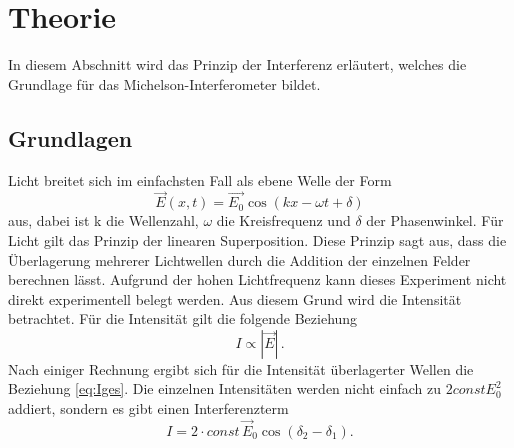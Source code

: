 \section{Theorie}
\label{sec:theorie}

In diesem Abschnitt wird das Prinzip der Interferenz erläutert, welches die Grundlage für das Michelson-Interferometer bildet.

\subsection{Grundlagen}

Licht breitet sich im einfachsten Fall als ebene Welle der Form 
\begin{equation}
    \vec{E}(x,t) = \vec{E_0} \cos{(kx - \omega t + \delta)}
    \label{eq:ebenewellen}
\end{equation}
aus, dabei ist k die Wellenzahl, $\omega$ die Kreisfrequenz und $\delta$ der Phasenwinkel. Für Licht gilt das Prinzip der linearen Superposition. Diese Prinzip sagt aus, dass die Überlagerung mehrerer Lichtwellen durch die Addition der einzelnen Felder berechnen lässt.
Aufgrund der hohen Lichtfrequenz kann dieses Experiment nicht direkt experimentell belegt werden. Aus diesem Grund wird die Intensität betrachtet. Für die Intensität gilt die folgende Beziehung 
\begin{equation*}
    I \propto |\vec{E}| \, .
\end{equation*}
Nach einiger Rechnung ergibt sich für die Intensität überlagerter Wellen die Beziehung \eqref{eq:Iges}. Die einzelnen Intensitäten werden nicht einfach zu $2 const E_{0}^{2}$ addiert, sondern es gibt einen Interferenzterm
\begin{equation*}
    I = 2 \cdot const \, \vec{E}_0 \cos{(\delta_2 - \delta_1)}.
\end{equation*}


